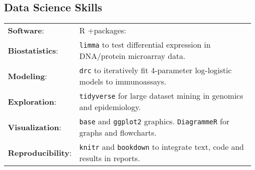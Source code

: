\documentclass[margin,line]{res}
\begin{document}
\begin{resume}
\section{\sc Data Science Skills}%
\begin{tabular}{ l l }
	{\bf Software}: &  R +packages:\\ %
	{\bf Biostatistics}: & \texttt{limma} to test differential expression in DNA/protein microarray data.\\ %
	{\bf Modeling}: & \texttt{drc} to iteratively fit 4-parameter log-logistic models to immunoassays.\\
	{\bf Exploration}: & \texttt{tidyverse} for large dataset mining in genomics and epidemiology.\\%
	{\bf Visualization}: & \texttt{base} and \texttt{ggplot2} graphics. \texttt{DiagrammeR} for graphs and flowcharts.\\ 
	{\bf Reproducibility}: & \texttt{knitr} and \texttt{bookdown} to integrate text, code and results in reports.
\end{tabular}


\end{resume}
\end{document}
